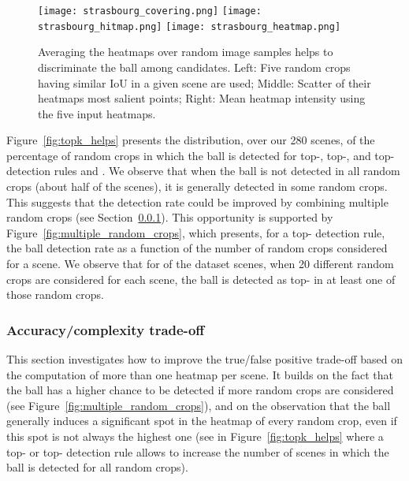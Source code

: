 \documentclass[sigconf, screen]{acmart}
\begin{document}
\begin{figure*}
    \begin{center}
    \texttt{[image: strasbourg\_covering.png]}
    \texttt{[image: strasbourg\_hitmap.png]}
    \texttt{[image: strasbourg\_heatmap.png]}
    \end{center}
    \vspace{-10pt}
    \caption{Averaging the heatmaps over random image samples helps to discriminate the ball among candidates. Left: Five random crops having similar IoU in a given scene are used; Middle: Scatter of their heatmaps most salient points; Right: Mean heatmap intensity using the five input heatmaps.}
    \label{fig:stacking_strategy}
\end{figure*}


Figure~\ref{fig:topk_helps} presents the distribution, over our 280 scenes, of the percentage of random crops in which the ball is detected for top-, top-, and top- detection rules and .
We observe that when the ball is not detected in all random crops (about half of the scenes), it is generally detected in some random crops.
This suggests that the detection rate could be improved by combining multiple random crops (see Section~\ref{subsec:tradeoff}). This opportunity is supported by Figure~\ref{fig:multiple_random_crops}, which presents, for a top- detection rule, the ball detection rate as a function of the number of random crops considered for a scene. We observe that for  of the dataset scenes, when 20 different random crops are considered for each scene, the ball is detected as top- in at least one of those random crops.



\subsubsection{Accuracy/complexity trade-off}
\label{subsec:tradeoff}




This section investigates how to improve the true/false positive trade-off based on the computation of more than one heatmap per scene.
It builds on the fact that the ball has a higher chance to be detected if more random crops are considered (see Figure~\ref{fig:multiple_random_crops}),
and on the observation that the ball generally induces a significant spot in the heatmap of every random crop, even if this spot is not always the highest one (see in Figure~\ref{fig:topk_helps} where a top- or top- detection rule allows to increase the number of scenes in which the ball is detected for all random crops).
\end{document}
